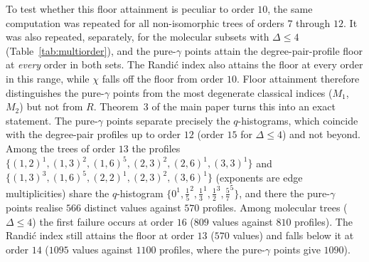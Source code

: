 \documentclass[a5paper, 10pt]{article}
\theoremstyle{plain}
\theoremstyle{remark}
\theoremstyle{definition}
\begin{document}
To test whether this floor attainment is peculiar to order $10$, the
same computation was repeated for all non-isomorphic trees of orders
$7$ through $12$. It was also repeated, separately, for the molecular
subsets with $\Delta \le 4$ (Table~\ref{tab:multiorder}), and the
pure-$\gamma$ points attain the degree-pair-profile floor at
\emph{every} order in both sets. The Randi\'c index also attains the
floor at every order in this range, while $\chi$ falls off the floor
from order $10$. Floor attainment therefore distinguishes the pure-$\gamma$ points from the most degenerate classical indices ($M_1$, $M_2$) but not from $R$.
Theorem~3 of the main paper turns this into an exact statement. The
pure-$\gamma$ points separate precisely the $q$-histograms, which
coincide with the degree-pair profiles up to order $12$ (order $15$ for
$\Delta \le 4$) and not beyond. Among the trees of order $13$ the
profiles
$\{(1,2)^{1}, (1,3)^{2}, (1,6)^{5}, (2,3)^{2}, (2,6)^{1}, (3,3)^{1}\}$
and $\{(1,3)^{3}, (1,6)^{5}, (2,2)^{1}, (2,3)^{2}, (3,6)^{1}\}$
(exponents are edge multiplicities) share the $q$-histogram
$\{0^{1}, \tfrac15^{2}, \tfrac13^{1}, \tfrac12^{3}, \tfrac57^{5}\}$,
and there the pure-$\gamma$ points realise $566$ distinct values against
$570$ profiles. Among molecular trees ($\Delta \le 4$) the first
failure occurs at order $16$ ($809$ values against $810$ profiles).
The Randi\'c index still attains the floor at order $13$ ($570$ values)
and falls below it at order $14$ ($1095$ values against $1100$
profiles, where the pure-$\gamma$ points give $1090$).
\end{document}
